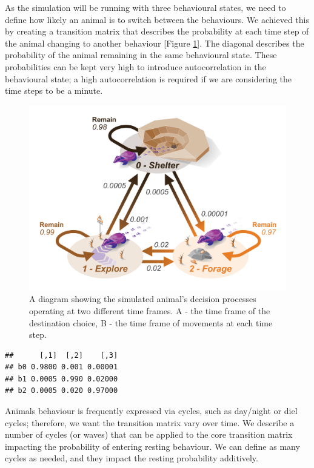 \documentclass[10pt,a4paper]{article}
\begin{document}
As the simulation will be running with three behavioural states, we need to define how likely an animal is to switch between the behaviours.
We achieved this by creating a transition matrix that describes the probability at each time step of the animal changing to another behaviour {[}Figure \ref{fig:transMatrixDiagram}{]}.
The diagonal describes the probability of the animal remaining in the same behavioural state.
These probabilities can be kept very high to introduce autocorrelation in the behavioural state; a high autocorrelation is required if we are considering the time steps to be a minute.

\begin{figure}

{\centering \includegraphics[width=0.8\linewidth]{../ext_figures/Tranistion Matrix Diagram} 

}

\caption{A diagram showing the simulated animal's decision processes operating at two different time frames. A - the time frame of the destination choice, B - the time frame of movements at each time step.}\label{fig:transMatrixDiagram}
\end{figure}

\begin{verbatim}
##      [,1]  [,2]    [,3]
## b0 0.9800 0.001 0.00001
## b1 0.0005 0.990 0.02000
## b2 0.0005 0.020 0.97000
\end{verbatim}

Animals behaviour is frequently expressed via cycles, such as day/night or diel cycles; therefore, we want the transition matrix vary over time.
We describe a number of cycles (or waves) that can be applied to the core transition matrix impacting the probability of entering resting behaviour.
We can define as many cycles as needed, and they impact the resting probability additively.
\end{document}
